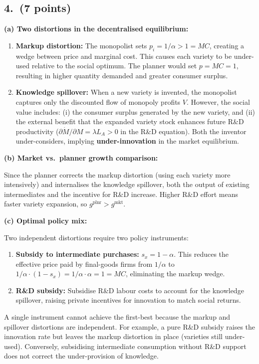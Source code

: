 \documentclass[a4paper,11pt]{article}
\begin{document}
\subsection*{4.\ (7 points)}

\begin{answerbox}
\textbf{(a) Two distortions in the decentralised equilibrium:}

\begin{enumerate}[label=(\roman*), itemsep=4pt]
    \item \textbf{Markup distortion:} The monopolist sets $p_i = 1/\alpha > 1 = MC$, creating a wedge between price and marginal cost. This causes each variety to be under-used relative to the social optimum. The planner would set $p = MC = 1$, resulting in higher quantity demanded and greater consumer surplus.

    \item \textbf{Knowledge spillover:} When a new variety is invented, the monopolist captures only the discounted flow of monopoly profits $V$. However, the social value includes: (i) the consumer surplus generated by the new variety, and (ii) the external benefit that the expanded variety stock enhances future R\&D productivity ($\partial \dot{M}/\partial M = \lambda L_A > 0$ in the R\&D equation). Both the inventor under-considers, implying \textbf{under-innovation} in the market equilibrium.
\end{enumerate}

\textbf{(b) Market vs.\ planner growth comparison:}

Since the planner corrects the markup distortion (using each variety more intensively) and internalises the knowledge spillover, both the output of existing intermediates and the incentive for R\&D increase.  Higher R\&D effort means faster variety expansion, so $g^{\mathrm{plnr}} > g^{\mathrm{mkt}}$.

\textbf{(c) Optimal policy mix:}

Two independent distortions require two policy instruments:

\begin{enumerate}[label=(\roman*), itemsep=4pt]
    \item \textbf{Subsidy to intermediate purchases:} $s_x = 1-\alpha$. This reduces the effective price paid by final-goods firms from $1/\alpha$ to $1/\alpha \cdot (1-s_x) = 1/\alpha \cdot \alpha = 1 = MC$, eliminating the markup wedge.

    \item \textbf{R\&D subsidy:} Subsidise R\&D labour costs to account for the knowledge spillover, raising private incentives for innovation to match social returns.
\end{enumerate}

A single instrument cannot achieve the first-best because the markup and spillover distortions are independent. For example, a pure R\&D subsidy raises the innovation rate but leaves the markup distortion in place (varieties still under-used). Conversely, subsidising intermediate consumption without R\&D support does not correct the under-provision of knowledge.
\end{answerbox}
\end{document}
